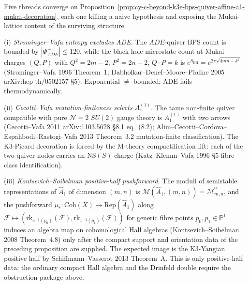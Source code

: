 \begin{remark}
\label{rem:cy-c-beyond-k3e-bps-quiver-monster-mathieu}
Five threads converge on
Proposition~\ref{prop:cy-c-beyond-k3e-bps-quiver-affine-a1-mukai-decoration},
each one killing a naive hypothesis and exposing the Mukai-lattice
content of the surviving structure.

\textup{(i)} \emph{Strominger--Vafa entropy excludes ADE.} The
$ADE$-quiver BPS count is bounded by $|\Phi^+_{ADE}|\le 120$, while
the black-hole microstate count at Mukai charges $(Q,P)$ with
$Q^2=2m-2$, $P^2=2n-2$, $Q\cdot P=k$ is
$e^{S_{\mathrm{BH}}}=e^{2\pi\sqrt{4mn-k^2}}$ (Strominger--Vafa 1996
Theorem~1; Dabholkar--Denef--Moore--Pioline 2005
arXiv:hep-th/0502157 \S 5). Exponential $\ne$ bounded; ADE fails
thermodynamically.

\textup{(ii)} \emph{Cecotti--Vafa mutation-finiteness selects
$A_1^{(1)}$.} The tame non-finite quiver compatible with pure
$\mathcal N=2$ $SU(2)$ gauge theory is $A_1^{(1)}$ with two arrows
(Cecotti--Vafa 2011 arXiv:1103.5628 \S 8.1 eq.~(8.2);
Alim--Cecotti--Cordova--Espahbodi--Rastogi--Vafa 2013 Theorem~3.2
mutation-finite classification). The K3-Picard decoration is forced
by the M-theory compactification lift: each of the two quiver nodes
carries an $\mathrm{NS}(S)$-charge (Katz--Klemm--Vafa 1996 \S 5
fibre-class identification).

\textup{(iii)} \emph{Kontsevich--Soibelman positive-half pushforward.}
The moduli of semistable representations of
$\widehat A_1$ of dimension $(m,n)$ is
$\mathcal M(\widehat A_1,(m,n))
=\overline{\mathcal M}_{m,n}^{\mathrm{ss}}$, and the pushforward
$\mu_*:\mathrm{Coh}(X)\to\mathrm{Rep}(\widehat A_1)$ along
$\mathcal F\mapsto(\mathrm{rk}_{\pi^{-1}(p_0)}(\mathcal F),
\mathrm{rk}_{\pi^{-1}(p_1)}(\mathcal F))$
for generic fibre points $p_0,p_1\in\mathbb P^1$ induces an algebra
map on cohomological Hall algebras (Kontsevich--Soibelman 2008
Theorem~4.8) only after the compact support and orientation data of the
preceding proposition are supplied. The expected image is the
K3-Yangian positive half by Schiffmann--Vasserot 2013 Theorem~A. This is
only positive-half data; the ordinary compact Hall algebra and the
Drinfeld double require the obstruction package above.


\end{remark}
